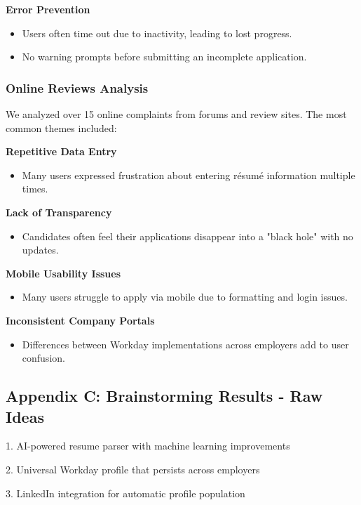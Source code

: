\documentclass[
	letterpaper, %
]{jdf}
\begin{document}
\begin{sloppypar}
\textbf{Error Prevention}  
\begin{itemize}  
    \item Users often time out due to inactivity, leading to lost progress.  
    \item No warning prompts before submitting an incomplete application.  
\end{itemize}   

\subsubsection*{Online Reviews Analysis}  

We analyzed over 15 online complaints from forums and review sites. The most common themes included:  

\textbf{Repetitive Data Entry}  
\begin{itemize}  
    \item Many users expressed frustration about entering résumé information multiple times.  
\end{itemize}   

\textbf{Lack of Transparency}  
\begin{itemize}  
    \item Candidates often feel their applications disappear into a "black hole" with no updates.  
\end{itemize}   

\textbf{Mobile Usability Issues}  
\begin{itemize}  
    \item Many users struggle to apply via mobile due to formatting and login issues.  
\end{itemize}  

\textbf{Inconsistent Company Portals}  
\begin{itemize}  
    \item Differences between Workday implementations across employers add to user confusion.  
\end{itemize}  


\subsection{Appendix C: Brainstorming Results - Raw Ideas}

1. AI-powered resume parser with machine learning improvements

2. Universal Workday profile that persists across employers

3. LinkedIn integration for automatic profile population


\end{sloppypar}
\end{document}

